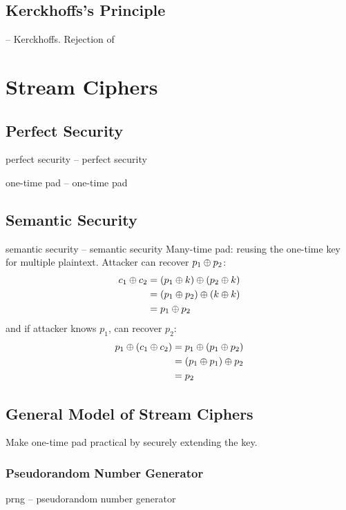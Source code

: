 \documentclass[draft]{article}
\begin{document}
\subsection{Kerckhoffs’s Principle}
 -- \glsdesc*{Kerckhoffs}. Rejection of 
\section{Stream Ciphers}
\subsection{Perfect Security}
\Gls{perfect security} -- \glsdesc*{perfect security}

\Gls{one-time pad} -- \glsdesc*{one-time pad}
\subsection{Semantic Security}
\Gls{semantic security} -- \glsdesc*{semantic security}
Many-time pad: reusing the one-time key for multiple plaintext. Attacker can recover $p_1 \oplus p_2$:
\begin{align*}c_1 \oplus c_2
     & = (p_1 \oplus k) \oplus (p_2 \oplus k) \\
     & = (p_1 \oplus p_2) \oplus (k \oplus k) \\
     & = p_1 \oplus p_2
\end{align*}
and if attacker knows $p_1$, can recover $p_2$:
\begin{align*}p_1 \oplus (c_1 \oplus c_2)
     & = p_1 \oplus (p_1 \oplus p_2) \\
     & = (p_1 \oplus p_1) \oplus p_2 \\
     & = p_2
\end{align*}
\subsection{General Model of Stream Ciphers}
Make one-time pad practical by securely extending the key.
\subsubsection*{Pseudorandom Number Generator}
\acrfull{prng} -- \glsdesc*{pseudorandom number generator}
\end{document}
